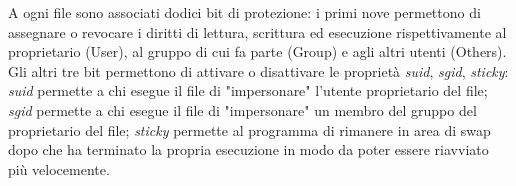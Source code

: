 \documentclass[answers,a4paper,12pt]{exam}
\begin{document}
\begin{questions}
\begin{solutionorlines}[3.8in]
A ogni file sono associati dodici bit di protezione: i primi nove permettono di assegnare o revocare i diritti di lettura, scrittura ed esecuzione rispettivamente al proprietario (User), al gruppo di cui fa parte (Group) e agli altri utenti (Others). Gli altri tre bit permettono di attivare o disattivare le proprietà \textit{suid}, \textit{sgid}, \textit{sticky}: \textit{suid} permette a chi esegue il file di "impersonare" l'utente proprietario del file; \textit{sgid} permette a chi esegue il file di "impersonare" un membro del gruppo del proprietario del file; \textit{sticky} permette al programma di rimanere in area di swap dopo che ha terminato la propria esecuzione in modo da poter essere riavviato più velocemente.

\end{solutionorlines}


\end{questions}
\end{document}
